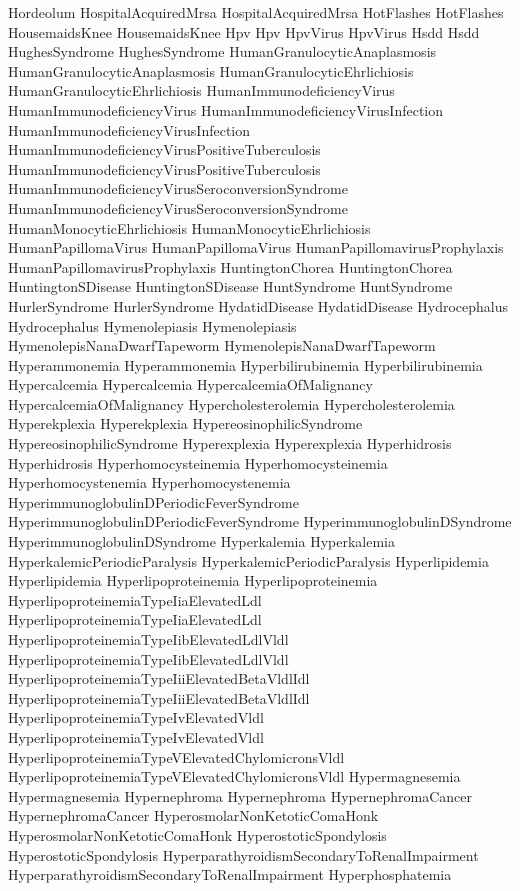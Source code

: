  Hordeolum
 HospitalAcquiredMrsa
 HospitalAcquiredMrsa
 HotFlashes
 HotFlashes
 HousemaidsKnee
 HousemaidsKnee
 Hpv
 Hpv
 HpvVirus
 HpvVirus
 Hsdd
 Hsdd
 HughesSyndrome
 HughesSyndrome
 HumanGranulocyticAnaplasmosis
 HumanGranulocyticAnaplasmosis
 HumanGranulocyticEhrlichiosis
 HumanGranulocyticEhrlichiosis
 HumanImmunodeficiencyVirus
 HumanImmunodeficiencyVirus
 HumanImmunodeficiencyVirusInfection
 HumanImmunodeficiencyVirusInfection
 HumanImmunodeficiencyVirusPositiveTuberculosis
 HumanImmunodeficiencyVirusPositiveTuberculosis
 HumanImmunodeficiencyVirusSeroconversionSyndrome
 HumanImmunodeficiencyVirusSeroconversionSyndrome
 HumanMonocyticEhrlichiosis
 HumanMonocyticEhrlichiosis
 HumanPapillomaVirus
 HumanPapillomaVirus
 HumanPapillomavirusProphylaxis
 HumanPapillomavirusProphylaxis
 HuntingtonChorea
 HuntingtonChorea
 HuntingtonSDisease
 HuntingtonSDisease
 HuntSyndrome
 HuntSyndrome
 HurlerSyndrome
 HurlerSyndrome
 HydatidDisease
 HydatidDisease
 Hydrocephalus
 Hydrocephalus
 Hymenolepiasis
 Hymenolepiasis
 HymenolepisNanaDwarfTapeworm
 HymenolepisNanaDwarfTapeworm
 Hyperammonemia
 Hyperammonemia
 Hyperbilirubinemia
 Hyperbilirubinemia
 Hypercalcemia
 Hypercalcemia
 HypercalcemiaOfMalignancy
 HypercalcemiaOfMalignancy
 Hypercholesterolemia
 Hypercholesterolemia
 Hyperekplexia
 Hyperekplexia
 HypereosinophilicSyndrome
 HypereosinophilicSyndrome
 Hyperexplexia
 Hyperexplexia
 Hyperhidrosis
 Hyperhidrosis
 Hyperhomocysteinemia
 Hyperhomocysteinemia
 Hyperhomocystenemia
 Hyperhomocystenemia
 HyperimmunoglobulinDPeriodicFeverSyndrome
 HyperimmunoglobulinDPeriodicFeverSyndrome
 HyperimmunoglobulinDSyndrome
 HyperimmunoglobulinDSyndrome
 Hyperkalemia
 Hyperkalemia
 HyperkalemicPeriodicParalysis
 HyperkalemicPeriodicParalysis
 Hyperlipidemia
 Hyperlipidemia
 Hyperlipoproteinemia
 Hyperlipoproteinemia
 HyperlipoproteinemiaTypeIiaElevatedLdl
 HyperlipoproteinemiaTypeIiaElevatedLdl
 HyperlipoproteinemiaTypeIibElevatedLdlVldl
 HyperlipoproteinemiaTypeIibElevatedLdlVldl
 HyperlipoproteinemiaTypeIiiElevatedBetaVldlIdl
 HyperlipoproteinemiaTypeIiiElevatedBetaVldlIdl
 HyperlipoproteinemiaTypeIvElevatedVldl
 HyperlipoproteinemiaTypeIvElevatedVldl
 HyperlipoproteinemiaTypeVElevatedChylomicronsVldl
 HyperlipoproteinemiaTypeVElevatedChylomicronsVldl
 Hypermagnesemia
 Hypermagnesemia
 Hypernephroma
 Hypernephroma
 HypernephromaCancer
 HypernephromaCancer
 HyperosmolarNonKetoticComaHonk
 HyperosmolarNonKetoticComaHonk
 HyperostoticSpondylosis
 HyperostoticSpondylosis
 HyperparathyroidismSecondaryToRenalImpairment
 HyperparathyroidismSecondaryToRenalImpairment
 Hyperphosphatemia
